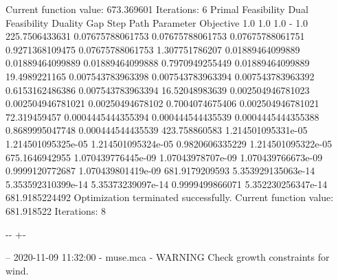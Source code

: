 \documentclass[letterpaper,10pt,english]{sphinxmanual}
\newlength\nbsphinxcodecellspacing
\begin{document}
{\begin{sphinxVerbatim}[commandchars=\\\{\}]
         Current function value: 673.369601
         Iterations: 6
Primal Feasibility  Dual Feasibility    Duality Gap         Step             Path Parameter      Objective
1.0                 1.0                 1.0                 -                1.0                 225.7506433631
0.07675788061753    0.07675788061753    0.07675788061751    0.9271368109475  0.07675788061753    1.307751786207
0.01889464099889    0.01889464099889    0.01889464099888    0.7970949255449  0.01889464099889    19.4989221165
0.007543783963398   0.007543783963394   0.007543783963392   0.6153162486386  0.007543783963394   16.52048983639
0.002504946781023   0.002504946781021   0.00250494678102    0.7004074675406  0.002504946781021   72.319459457
0.0004445444355394  0.000444544435539   0.0004445444355388  0.8689995047748  0.000444544435539   423.758860583
1.214501095331e-05  1.214501095325e-05  1.214501095324e-05  0.9820606335229  1.214501095322e-05  675.1646942955
1.070439776445e-09  1.07043978707e-09   1.070439766673e-09  0.9999120772687  1.070439801419e-09  681.9179209593
5.353929135063e-14  5.353592310399e-14  5.35373239097e-14   0.9999499866071  5.352230256347e-14  681.9185224492
Optimization terminated successfully.
         Current function value: 681.918522
         Iterations: 8
\end{sphinxVerbatim}
}

{

\kern-\sphinxverbatimsmallskipamount\kern-\baselineskip
\kern+\FrameHeightAdjust\kern-\fboxrule
\vspace{\nbsphinxcodecellspacing}

\begin{sphinxVerbatim}[commandchars=\\\{\}]
-- 2020-11-09 11:32:00 - muse.mca - WARNING
Check growth constraints for wind.

\end{sphinxVerbatim}
}
\end{document}

